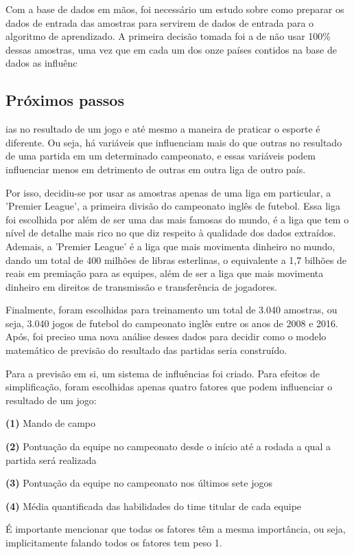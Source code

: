 Com a base de dados em mãos, foi necessário um estudo sobre como preparar os dados de entrada das amostras para servirem de dados de entrada para o algoritmo de aprendizado. A primeira decisão tomada foi a de não usar 100\% dessas amostras, uma vez que em cada um dos onze países contidos na base de dados as influênc\subsection{Próximos passos}ias no resultado de um jogo e até mesmo a maneira de praticar o esporte é diferente. Ou seja, há variáveis que influenciam mais do que outras no resultado de uma partida em um determinado campeonato, e essas variáveis podem influenciar menos em detrimento de outras em outra liga de outro país.

Por isso, decidiu-se por usar as amostras apenas de uma liga em particular, a 'Premier League', a primeira divisão do campeonato inglês de futebol. Essa liga foi escolhida por além de ser uma das mais famosas do mundo, é a liga que tem o nível de detalhe mais rico no que diz respeito à qualidade dos dados extraídos. Ademais, a 'Premier League' é a liga que mais movimenta dinheiro no mundo, dando um total de 400 milhões de libras esterlinas, o equivalente a 1,7 bilhões de reais em premiação para as equipes, além de ser a liga que mais movimenta dinheiro em direitos de transmissão e transferência de jogadores.

Finalmente, foram escolhidas para treinamento um total de 3.040 amostras, ou seja, 3.040 jogos de futebol do campeonato inglês entre os anos de 2008 e 2016. Após, foi preciso uma nova análise desses dados para decidir como o modelo matemático de previsão do resultado das partidas seria construído.

Para a previsão em si, um sistema de influências foi criado. Para efeitos de simplificação, foram escolhidas apenas quatro fatores que podem influenciar o resultado de um jogo:

\textbf{(1)} Mando de campo

\textbf{(2)} Pontuação da equipe no campeonato desde o início até a rodada a qual a partida será realizada

\textbf{(3)} Pontuação da equipe no campeonato nos últimos sete jogos

\textbf{(4)} Média quantificada das habilidades do time titular de cada equipe


É importante mencionar que todas os fatores têm a mesma importância, ou seja, implicitamente falando todos os fatores tem peso 1.

